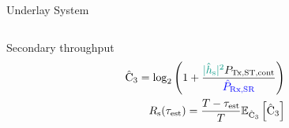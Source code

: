\documentclass[16pt]{beamer}
\begin{document}
\begin{frame}[t]{Underlay System}
\begin{columns}
\begin{column}{0.45\columnwidth}

			{
				\begin{block}{\footnotesize Secondary throughput} %
				\vspace{-3mm}
				\begin{align*}
					\eca  = \log_2 \left(1 + \frac{{\color{kit-green100}{\epgs}} \preg}{{\color{blue}{\eprcvdsr}}} \right) \\
					\rs(\test) = \frac{T - \test}{T} \e{\eca} {\eca} 
				\end{align*}
				\end{block}

}
\end{column}
\end{columns}
\end{frame}
\end{document}
